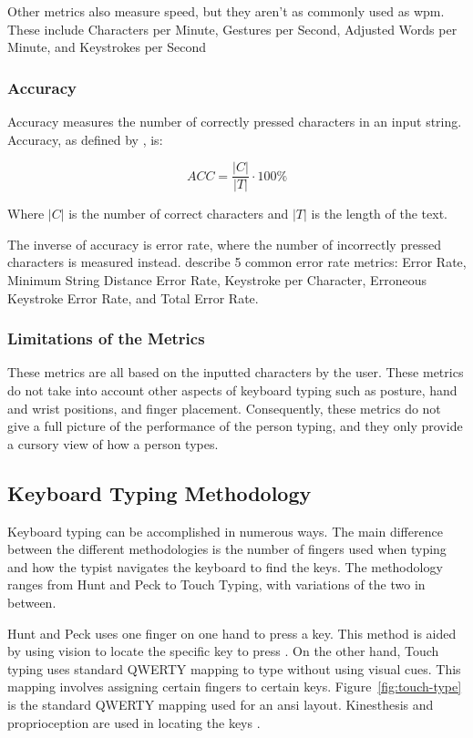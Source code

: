 \documentclass{report}
\begin{document}
Other metrics also measure speed, but they aren't as commonly used as \ac{wpm}.
These include Characters per Minute, Gestures per Second, Adjusted Words per
Minute, and Keystrokes per Second

\subsubsection{Accuracy}
Accuracy measures the number of correctly pressed characters in an input string.
Accuracy, as defined by \citeauthor{bartnik2021}, is:

\begin{equation}
	ACC = \frac{|C|}{|T|} \cdot 100\%
\end{equation}

Where $|C|$ is the number of correct characters and $|T|$ is the length of the
text.

The inverse of accuracy is error rate, where the number of incorrectly pressed
characters is measured instead. \citeauthor{arif2009} describe 5 common error
rate metrics: Error Rate, Minimum String Distance Error Rate, Keystroke per
Character, Erroneous Keystroke Error Rate, and Total Error Rate.

\subsubsection{Limitations of the Metrics}
These metrics are all based on the inputted characters by the user. These
metrics do not take into account other aspects of keyboard typing such as
posture, hand and wrist positions, and finger placement. Consequently, these
metrics do not give a full picture of the performance of the person typing, and
they only provide a cursory view of how a person types.

\subsection{Keyboard Typing Methodology}
Keyboard typing can be accomplished in numerous ways. The main difference
between the different methodologies is the number of fingers used when typing
and how the typist navigates the keyboard to find the keys. The methodology
ranges from Hunt and Peck to Touch Typing, with variations of the two in
between.

Hunt and Peck uses one finger on one hand to press a key. This method is aided
by using vision to locate the specific key to press \parencite{hoot1986}. On the
other hand, Touch typing uses standard QWERTY mapping to type without using
visual cues. \parencite{dobson2009touch} This mapping involves assigning certain
fingers to certain keys. Figure~\ref{fig:touch-type} is the standard QWERTY
mapping used for an \ac{ansi} layout. Kinesthesis and proprioception are used in
locating the keys \parencite{logan2016}.
\end{document}
